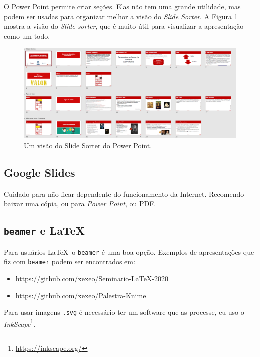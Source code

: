 O Power Point permite criar seções. Elas não tem uma grande utilidade, mas podem ser usadas para organizar melhor a visão do \textit{Slide Sorter}. A Figura \ref{fig:sorter} mostra a visão do \textit{Slide sorter}, que é muito útil para visualizar a apresentação como um todo.

\begin{figure}[tbh]
    \centering
    \includegraphics[width=0.7\linewidth]{imagens/slidesorter}
    \caption{Um visão do Slide Sorter do Power Point.}
    \label{fig:sorter}
\end{figure}



\subsection{Google Slides}

Cuidado para não ficar dependente do funcionamento da Internet. Recomendo baixar uma cópia, ou para \textit{Power Point}, ou PDF.

\subsection{\texttt{beamer} e \LaTeX}

Para usuários \LaTeX\ o \texttt{beamer} é uma boa opção. Exemplos de apresentações que fiz com \texttt{beamer} podem ser encontrados em:
\begin{itemize}
    \item \url{https://github.com/xexeo/Seminario-LaTeX-2020}
    \item \url{https://github.com/xexeo/Palestra-Knime}
\end{itemize}

Para usar imagens \texttt{.svg} é necessário ter um software que as processe, eu uso o \textit{InkScape}\footnote{\url{https://inkscape.org/}}.






